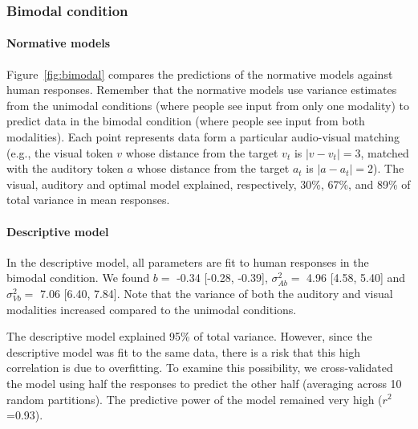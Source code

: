 \documentclass[english,,man,floatsintext]{apa6}
\let\oldparagraph\paragraph
\renewcommand{\paragraph}[1]{\oldparagraph{#1}\mbox{}}
\theoremstyle{definition}
\theoremstyle{definition}
\theoremstyle{definition}
\theoremstyle{remark}
\begin{document}
\subsubsection{Bimodal condition}\label{bimodal-condition-1}

\paragraph{Normative models}\label{normative-models}

Figure~\ref{fig:bimodal} compares the predictions of the normative
models against human responses. Remember that the normative models use
variance estimates from the unimodal conditions (where people see input
from only one modality) to predict data in the bimodal condition (where
people see input from both modalities). Each point represents data form
a particular audio-visual matching (e.g., the visual token \(v\) whose
distance from the target \(v_t\) is \(|v-v_t|=3\), matched with the
auditory token \(a\) whose distance from the target \(a_t\) is
\(|a-a_t|=2\)). The visual, auditory and optimal model explained,
respectively, 30\%, 67\%, and 89\% of total variance in mean responses.

\paragraph{Descriptive model}\label{descriptive-model}

In the descriptive model, all parameters are fit to human responses in
the bimodal condition. We found \(b=\) -0.34 {[}-0.28, -0.39{]},
\(\sigma^2_{Ab}=\) 4.96 {[}4.58, 5.40{]} and \(\sigma^2_{Vb}=\) 7.06
{[}6.40, 7.84{]}. Note that the variance of both the auditory and visual
modalities increased compared to the unimodal conditions.

\noindent The descriptive model explained 95\% of total variance.
However, since the descriptive model was fit to the same data, there is
a risk that this high correlation is due to overfitting. To examine this
possibility, we cross-validated the model using half the responses to
predict the other half (averaging across 10 random partitions). The
predictive power of the model remained very high (\(r^2\)=0.93).
\end{document}
